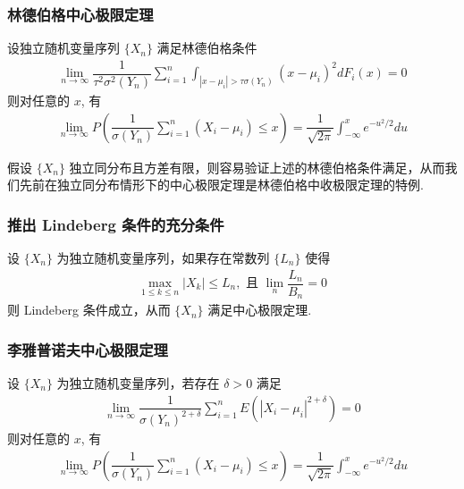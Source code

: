 \begin{frame}
	\frametitle{林德伯格中心极限定理}
	\begin{thm}
		设独立随机变量序列 $\{X_n\}$ 满足林德伯格条件
		\begin{eqnarray*}%
			\lim_{n\rightarrow\infty} \dfrac{1}{\tau^2\sigma^2(Y_n)}\sum_{i=1}^n\int_{|x-\mu_i|>\tau\sigma(Y_n)}(x-\mu_i)^2dF_i(x)=0
		\end{eqnarray*} 则对任意的 $x$, 有
		\begin{eqnarray*}
			\lim_{n\rightarrow\infty}P(\dfrac{1}{\sigma(Y_n)}\sum_{i=1}^n(X_i-\mu_i)\le x)=\dfrac{1}{\sqrt{2\pi}}\int_{-\infty}^xe^{-u^2/2}du
		\end{eqnarray*}
	\end{thm}
	\pause
	\begin{rmk}
		假设 $\{X_n\}$ 独立同分布且方差有限，则容易验证上述的林德伯格条件满足，从而我们先前在独立同分布情形下的中心极限定理是林德伯格中收极限定理的特例.
	\end{rmk}
\end{frame}

\begin{frame}
	\frametitle{推出 Lindeberg 条件的充分条件}
	\begin{thm}
		设 $\{X_n\}$ 为独立随机变量序列，如果存在常数列 $\{L_n\}$ 使得
		\begin{eqnarray*}
			\max_{1\leq k\leq n}|X_k|\leq L_n, \mbox{ 且 } \lim_{n}\dfrac{L_n}{B_n}=0
		\end{eqnarray*}
		则 Lindeberg 条件成立，从而 $\{X_n\}$ 满足中心极限定理.
	\end{thm}
\end{frame}
\begin{frame}
	\frametitle{李雅普诺夫中心极限定理}
	\begin{thm} 设 $\{X_n\}$ 为独立随机变量序列，若存在 $\delta>0$ 满足
		\begin{eqnarray*}
			\lim_{n\rightarrow\infty}\dfrac{1}{\sigma(Y_n)^{2+\delta}}\sum_{i=1}^nE(|X_i-\mu_i|^{2+\delta})=0
		\end{eqnarray*}
		则对任意的 $x$, 有
		\begin{eqnarray*}
			\lim_{n\rightarrow\infty}P(\dfrac{1}{\sigma(Y_n)}\sum_{i=1}^n(X_i-\mu_i)\le x)=\dfrac{1}{\sqrt{2\pi}}\int_{-\infty}^xe^{-u^2/2}du
		\end{eqnarray*}

	\end{thm}
\end{frame}








